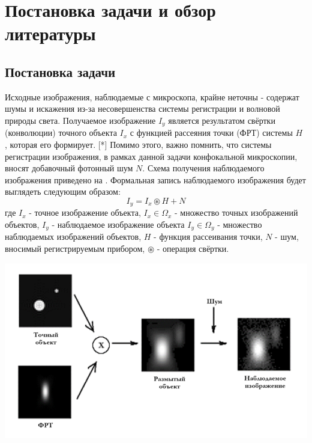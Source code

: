 \chapter{Постановка задачи и обзор литературы} \label{ch1}
\section{Постановка задачи} \label{ch1:sec1}
\par Исходные изображения, наблюдаемые с микроскопа, крайне неточны - содержат шумы и искажения из-за несовершенства системы регистрации и волновой природы света. Получаемое изображение $I_y$ является результатом свёртки (конволюции) точного объекта $I_x$ с функцией рассеяния точки (ФРТ) системы $H$ , которая его формирует. [*] Помимо этого, важно помнить, что системы регистрации изображения, в рамках данной задачи конфокальной микроскопии, вносят добавочный фотонный шум $N$. Схема получения наблюдаемого изображения приведено на . Формальная запись наблюдаемого изображения будет выглядеть следующим образом:
\begin{equation}\label{eq:problem}
	I_y = I_x \circledast H + N
\end{equation}
где $I_x$ - точное изображение объекта, $I_x \in \Omega_x$ - множество точных изображений объектов, $I_y$ - наблюдаемое изображение объекта $I_y \in \Omega_y$ - множество наблюдаемых изображений объектов, $H$ - функция рассеивания точки, $N$ - шум, вносимый регистрируемым прибором, $\circledast$ - операция свёртки.
\begin{minipage}{\textwidth}
	\centering
	\vspace{\mfloatsep} %
	\includegraphics[keepaspectratio=true,scale=0.55] {my_folder/images/problem/start.png}
	\label{fig:problem-start}  
	\vspace{\mfloatsep} %
\end{minipage}
